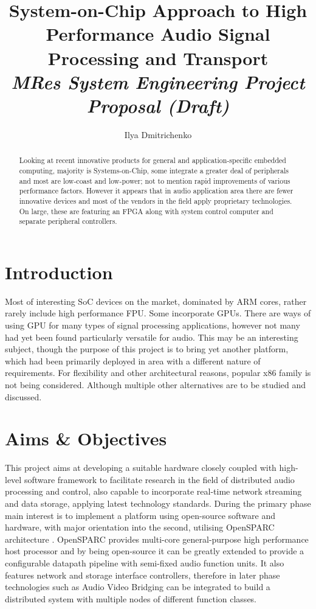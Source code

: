 \documentclass[twocolumn]{article}
\title{ System-on-Chip Approach to High Performance
	Audio Signal Processing and Transport \\
	\emph{\small{MRes System Engineering Project Proposal (Draft)}} }
\author{ Ilya Dmitrichenko }
\begin{document}
\maketitle

\begin{abstract}
\em

 Looking at recent innovative products for general and
 application-specific embedded computing, majority is
 Systems-on-Chip, some integrate a greater deal of peripherals
 and most are low-coast and low-power; not to mention rapid
 improvements of various performance factors.
  However it appears that in audio application area there
 are fewer innovative devices and most of the vendors in the
 field apply proprietary technologies. On large, these are
 featuring an FPGA along with system control computer and
 separate peripheral controllers.

\end{abstract}

\section{Introduction}

  Most of interesting SoC devices on the market, dominated by
 ARM cores, rather rarely include high performance FPU. Some
 incorporate GPUs. There are ways of using GPU for many types
 of signal processing applications, however not many had yet
 been found particularly versatile for audio. This may be an
 interesting subject, though the purpose of this project is
 to bring yet another platform, which had been primarily
 deployed in area with a different nature of requirements.
  For flexibility and other architectural reasons, popular
 x86 family is not being considered. Although multiple other
 alternatives are to be studied and discussed.



\section{Aims \& Objectives}

  This project aims at developing a suitable hardware closely coupled
  with high-level software framework to facilitate research in the field
  of distributed audio processing and control, also capable to incorporate 
  real-time network streaming and data storage, applying latest technology
  standards.
  During the primary phase main interest is to implement a platform
  using open-source software and hardware, with major orientation into
  the second, utilising OpenSPARC architecture \cite{weaver2008opensparc,
  page:opensparc:docs}.
  OpenSPARC provides multi-core general-purpose high performance host
  processor and by being open-source it can be greatly extended to provide 
  a configurable datapath pipeline with semi-fixed audio function units.
  It also features network and storage interface controllers, therefore in
  later phase technologies such as Audio Video Bridging \cite{page:avb:home,
  paper:avb:pro, paper:avb:intro} can be integrated to build a distributed
  system with multiple nodes of different function classes. 
  
\end{document}
